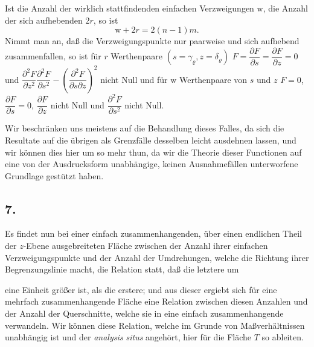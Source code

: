 \documentclass{article}
\begin{document}
Ist die Anzahl der wirklich stattfindenden einfachen Verzweigungen $\mathrm{w}$, die Anzahl der sich aufhebenden $2r$, so ist
\[ \mathrm{w} + 2r = 2(n-1)m. \]
Nimmt man an, daß die Verzweigungspunkte nur paarweise und sich aufhebend zusammenfallen, so ist für $r$ Werthenpaare $(s = \gamma_{\varrho}, z = \delta_{\varrho})$ $F = \dfrac{\partial F}{\partial s} = \dfrac{\partial F}{\partial z} = 0$ und $\dfrac{\partial^{2}F}{\partial z^{2}} \dfrac{\partial^{2}F}{\partial s^{2}} - \left(\dfrac{\partial^{2}F}{\partial s \partial z}\right)^{2}$ nicht Null und für $\mathrm{w}$ Werthenpaare von $s$ und $z$ $F = 0$, $\dfrac{\partial F}{\partial s} = 0$, $\dfrac{\partial F}{\partial z}$ nicht Null und $\dfrac{\partial^{2}F}{\partial s^{2}}$ nicht Null.

Wir beschränken uns meistens auf die Behandlung dieses Falles, da sich die Resultate auf die übrigen als Grenzfälle desselben leicht ausdehnen lassen, und wir können dies hier um so mehr thun, da wir die Theorie dieser Functionen auf eine von der Ausdrucksform unabhängige, keinen Ausnahmefällen unterworfene Grundlage gestützt haben.

\subsection*{7.}

Es findet nun bei einer einfach zusammenhangenden, über einen endlichen Theil der $z$-Ebene ausgebreiteten Fläche zwischen der Anzahl ihrer einfachen Verzweigungspunkte und der Anzahl der Umdrehungen, welche die Richtung ihrer Begrenzungslinie macht, die Relation statt, daß die letztere um

eine Einheit größer ist, als die erstere; und aus dieser ergiebt sich für eine mehrfach zusammenhangende Fläche eine Relation zwischen diesen Anzahlen und der Anzahl der Querschnitte, welche sie in eine einfach zusammenhangende verwandeln. Wir können diese Relation, welche im Grunde von Maßverhältnissen unabhängig ist und der \emph{analysis situs} angehört, hier für die Fläche $T$ so ableiten.
\end{document}
